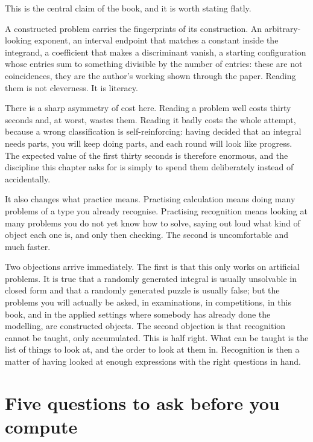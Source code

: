 This is the central claim of the book, and it is worth stating flatly.

\begin{keynote}
A constructed problem carries the fingerprints of its construction. An arbitrary-looking exponent, an interval endpoint that matches a constant inside the integrand, a coefficient that makes a discriminant vanish, a starting configuration whose entries sum to something divisible by the number of entries: these are not coincidences, they are the author's working shown through the paper. Reading them is not cleverness. It is literacy.
\end{keynote}

There is a sharp asymmetry of cost here. Reading a problem well costs thirty seconds and, at worst, wastes them. Reading it badly costs the whole attempt, because a wrong classification is self-reinforcing: having decided that an integral needs parts, you will keep doing parts, and each round will look like progress. The expected value of the first thirty seconds is therefore enormous, and the discipline this chapter asks for is simply to spend them deliberately instead of accidentally.

It also changes what practice means. Practising calculation means doing many problems of a type you already recognise. Practising recognition means looking at many problems you do not yet know how to solve, saying out loud what kind of object each one is, and only then checking. The second is uncomfortable and much faster.

Two objections arrive immediately. The first is that this only works on artificial problems. It is true that a randomly generated integral is usually unsolvable in closed form and that a randomly generated puzzle is usually false; but the problems you will actually be asked, in examinations, in competitions, in this book, and in the applied settings where somebody has already done the modelling, are constructed objects. The second objection is that recognition cannot be taught, only accumulated. This is half right. What can be taught is the list of things to look at, and the order to look at them in. Recognition is then a matter of having looked at enough expressions with the right questions in hand.

\section{Five questions to ask before you compute}

